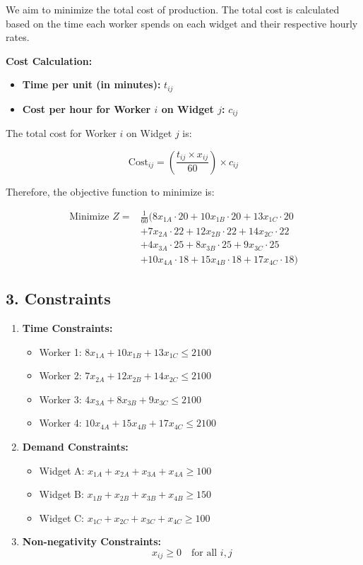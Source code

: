 \documentclass{article}
\begin{document}
We aim to minimize the total cost of production. The total cost is calculated based on the time each worker spends on each widget and their respective hourly rates.

\textbf{Cost Calculation:}

\begin{itemize}
    \item \textbf{Time per unit (in minutes):} $t_{ij}$
    \item \textbf{Cost per hour for Worker $i$ on Widget $j$:} $c_{ij}$
\end{itemize}

The total cost for Worker $i$ on Widget $j$ is:

\[ \text{Cost}_{ij} = \left( \frac{t_{ij} \times x_{ij}}{60} \right) \times c_{ij} \]

Therefore, the objective function to minimize is:

\begin{align*}
    \text{Minimize } Z = & \frac{1}{60} (8x_{1A} \cdot 20 + 10x_{1B} \cdot 20 + 13x_{1C} \cdot 20 \\
    & + 7x_{2A} \cdot 22 + 12x_{2B} \cdot 22 + 14x_{2C} \cdot 22 \\
    & + 4x_{3A} \cdot 25 + 8x_{3B} \cdot 25 + 9x_{3C} \cdot 25 \\
    & + 10x_{4A} \cdot 18 + 15x_{4B} \cdot 18 + 17x_{4C} \cdot 18)
\end{align*}

\subsection*{3. Constraints}

\begin{enumerate}
    \item \textbf{Time Constraints:}
    \begin{itemize}
        \item Worker 1: $8x_{1A} + 10x_{1B} + 13x_{1C} \leq 2100$
        \item Worker 2: $7x_{2A} + 12x_{2B} + 14x_{2C} \leq 2100$
        \item Worker 3: $4x_{3A} + 8x_{3B} + 9x_{3C} \leq 2100$
        \item Worker 4: $10x_{4A} + 15x_{4B} + 17x_{4C} \leq 2100$
    \end{itemize}

    \item \textbf{Demand Constraints:}
    \begin{itemize}
        \item Widget A: $x_{1A} + x_{2A} + x_{3A} + x_{4A} \geq 100$
        \item Widget B: $x_{1B} + x_{2B} + x_{3B} + x_{4B} \geq 150$
        \item Widget C: $x_{1C} + x_{2C} + x_{3C} + x_{4C} \geq 100$
    \end{itemize}

    \item \textbf{Non-negativity Constraints:}
    \[ x_{ij} \geq 0 \quad \text{for all } i, j \]
\end{enumerate}
\end{document}
